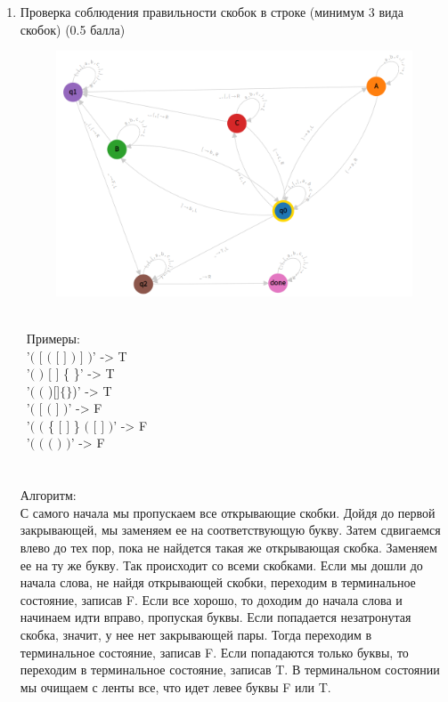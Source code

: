 \documentclass{article}
\begin{document}
\begin{enumerate}
\\ \\
\\ \newpage
    \item Проверка соблюдения правильности скобок в строке (минимум 3 вида скобок) (0.5 балла)
\\
\begin{figure}[h]
        \centering
        \includegraphics[width=17cm]{pictures/2.2.png}
\end{figure}\\ 
\ Примеры:\\
\ '$($ $[$ $($ $[$ $]$ $)$ $]$ $)$' -> T \\
\ '$($ $)$ $[$ $]$ \{ \}' -> T \\
\ '$($ $($ )$ $[$ $]$ \{\}$)' -> T \\
\ '$($ $[$ $($ $]$ $)$' -> F \\
\ '$($ $($ \{ $[$ $]$ \} $($ $[$ $]$ $)$' -> F \\
\ '$($ $($ $($ $)$ $)$' -> F\\
\\ \\
Алгоритм: \\
С самого начала мы пропускаем все открывающие скобки. Дойдя до первой закрывающей, мы заменяем ее на соответствующую букву. Затем сдвигаемся влево до тех пор, пока не найдется такая же открывающая скобка. Заменяем ее на ту же букву. Так происходит со всеми скобками. Если мы дошли до начала слова, не найдя открывающей скобки, переходим в терминальное состояние, записав F. Если все хорошо, то доходим до начала слова и начинаем идти вправо, пропуская буквы. Если попадается незатронутая скобка, значит, у нее нет закрывающей пары. Тогда переходим в терминальное состояние, записав F. Если попадаются только буквы, то переходим в терминальное состояние, записав T. В терминальном состоянии мы очищаем с ленты все, что идет левее буквы F или T.


\end{enumerate}
\end{document}
